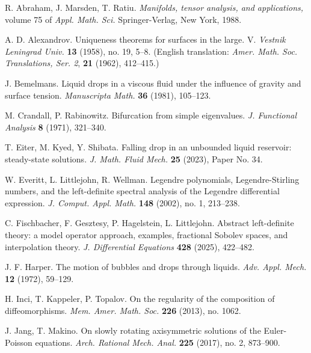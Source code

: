 \documentclass[11pt,reqno]{amsart}
\numberwithin{equation}{section}
\begin{document}
\begin{thebibliography}{}

 
  R. Abraham, J. Marsden, T. Ratiu. \emph{Manifolds, tensor analysis, and applications,}  volume 75 of \emph{Appl. Math. Sci.}  Springer-Verlag, New York, 1988. 

  A. D. Alexandrov. Uniqueness theorems for surfaces in the large.  V. \emph{Vestnik Leningrad Univ.} \textbf{13} (1958), no. 19, 5--8. (English translation: \emph{Amer. Math. Soc. Translations, Ser. 2}, \textbf{21} (1962), 412--415.)

  J. Bemelmans. Liquid drops in a viscous fluid under the influence of gravity and surface tension. \emph{Manuscripta Math.} \textbf{36} (1981), 105--123.

 
  M. Crandall, P. Rabinowitz. Bifurcation from simple eigenvalues. \emph{J. Functional Analysis} \textbf{8} (1971), 321--340.
  
   T. Eiter, M. Kyed, Y. Shibata. Falling drop in an unbounded liquid reservoir: steady-state solutions. \emph{J. Math. Fluid Mech.} \textbf{25} (2023), Paper No. 34.
 
  
  W. Everitt, L. Littlejohn, R. Wellman. Legendre polynomials, Legendre-Stirling numbers, and the left-definite spectral analysis of the Legendre differential expression. \emph{J. Comput. Appl. Math.} \textbf{148} (2002), no. 1, 213--238.
 
  C. Fischbacher, F. Gesztesy, P. Hagelstein, L. Littlejohn. Abstract left-definite theory: a model operator approach, examples, fractional Sobolev spaces, and interpolation theory. \emph{J. Differential Equations} \textbf{428} (2025), 422--482.
 
  J. F. Harper. The motion of bubbles and drops through liquids. \emph{Adv. Appl. Mech.} \textbf{12} (1972), 59--129.

 
  H. Inci, T. Kappeler, P. Topalov. On the regularity of the composition of diffeomorphisms. \emph{Mem. Amer. Math. Soc.} \textbf{226}  (2013), no. 1062.
 
 J. Jang, T. Makino. On slowly rotating axisymmetric solutions of the Euler-Poisson equations. \emph{Arch. Rational Mech. Anal.} \textbf{225} (2017), no. 2, 873--900. 


\end{thebibliography}
\end{document}
